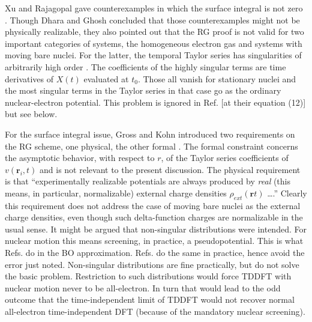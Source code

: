 \documentclass[aps,preprint]{revtex4}%
\begin{document}
Xu and Rajagopal gave counterexamples in which the surface integral is not
zero \cite{Xu85}. Though Dhara and Ghosh \cite{Dhara87} concluded that those
counterexamples might not be physically realizable, they also pointed out that
the RG proof is not valid for two important categories of systems, the
homogeneous electron gas \cite{HEGexample} and systems with moving bare
nuclei. For the latter, the temporal Taylor series has singularities of
arbitrarily high order \cite{bareTaylor}. The coefficients of the highly
singular terms are time derivatives of $X(t)$ evaluated at $t_{0}$. Those all
vanish for stationary nuclei and the most singular terms in the Taylor series
in that case go as the ordinary nuclear-electron potential. This problem is
ignored in Ref.  [at their equation (12)] but see below.

For the surface integral issue, Gross and Kohn introduced two requirements on
the RG scheme, one physical, the other formal \cite{GrossKohn90}. The formal
constraint concerns the asymptotic behavior, with respect to $r$, of the
Taylor series coefficients of $v(\mathbf{r}_{i},t)$ and is not relevant to the
present discussion. The physical requirement is that ``experimentally
realizable potentials are always produced by \emph{real} (this means, in
particular, normalizable) external charge densities $\rho_{ext}(\mathbf{r}t)$
\ldots.'' Clearly this requirement does not address the case of moving bare
nuclei as the external charge densities, even though such delta-function
charges are normalizable in the usual sense. It might be argued that
non-singular distributions were intended. For nuclear motion this means
screening, in practice, a pseudopotential. This is what Refs.
 do in the BO approximation. Refs.
 do the same in practice, hence avoid the error
just noted. Non-singular distributions are fine practically, but do not solve
the basic problem. Restriction to such distributions would force TDDFT with
nuclear motion never to be all-electron. In turn that would lead to the odd
outcome that the time-independent limit of TDDFT would not recover normal
all-electron time-independent DFT (because of the mandatory nuclear screening).
\end{document}
